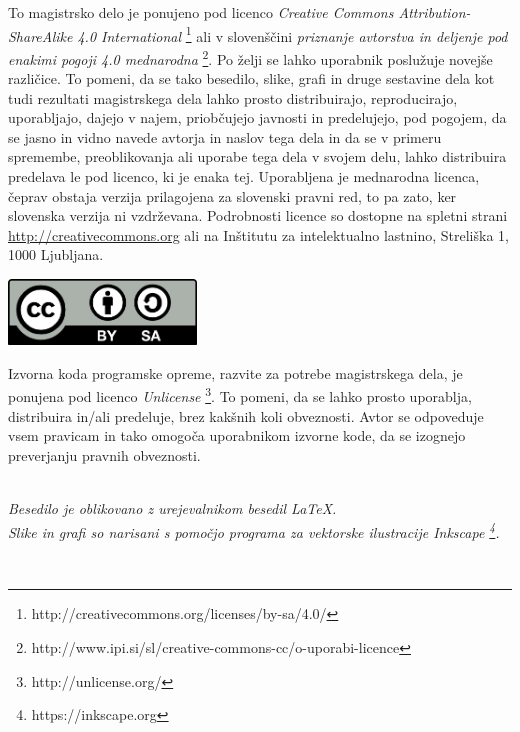 \documentclass[12pt,a4paper,openany,twoside]{book}
\begin{document}
\vspace*{5cm}
{\small \noindent
To magistrsko delo je ponujeno pod licenco \textit{Creative Commons Attribution-ShareAlike 4.0 International}
\footnote{http://creativecommons.org/licenses/by-sa/4.0/} ali v slovenščini \textit{priznanje avtorstva in deljenje pod enakimi pogoji 4.0 mednarodna}
\footnote{http://www.ipi.si/sl/creative-commons-cc/o-uporabi-licence}. Po želji se lahko uporabnik poslužuje novejše različice.
To pomeni, da se tako besedilo, slike, grafi in druge sestavine dela kot tudi rezultati magistrskega dela lahko prosto distribuirajo,
reproducirajo, uporabljajo, dajejo v najem, priobčujejo javnosti in predelujejo, pod pogojem, da se jasno in vidno navede avtorja in naslov tega
dela in da se v primeru spremembe, preoblikovanja ali uporabe tega dela v svojem delu, lahko distribuira predelava le pod
licenco, ki je enaka tej.
Uporabljena je mednarodna licenca, čeprav obstaja verzija prilagojena za slovenski pravni red, to pa zato, ker slovenska verzija ni vzdrževana.
Podrobnosti licence so dostopne na spletni strani \url{http://creativecommons.org}
ali na Inštitutu za intelektualno lastnino, Streliška 1, 1000 Ljubljana.
\begin{center}
\includegraphics[width=5cm]{by-sa.png}
\end{center}
}

\vspace*{1.5cm}
{\small \noindent
Izvorna koda programske opreme, razvite za potrebe magistrskega dela, je ponujena pod licenco \textit{Unlicense} \footnote{http://unlicense.org/}.
To pomeni, da se lahko prosto uporablja, distribuira in/ali predeluje, brez kakšnih koli obveznosti.
Avtor se odpoveduje vsem pravicam in tako omogoča uporabnikom izvorne kode, da se izognejo preverjanju pravnih obveznosti.
}

\begin{center} 
\ \\ \vfill
{\em Besedilo je oblikovano z urejevalnikom besedil \LaTeX.\\
Slike in grafi so narisani s pomočjo programa za vektorske ilustracije Inkscape \footnote{https://inkscape.org}.}
\end{center}

\newpage
\ \thispagestyle{empty}
\newpage
\end{document}
